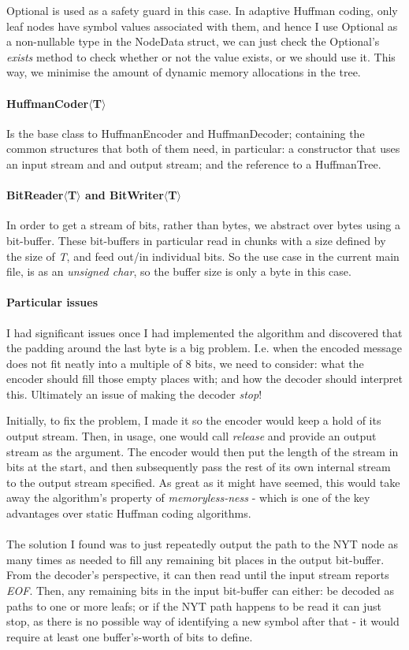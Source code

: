 \documentclass[]{article}
\begin{document}
Optional is used as a safety guard in this case. In adaptive Huffman coding, only leaf nodes have symbol values associated with them, and hence I use Optional as a non-nullable type in the NodeData struct, we can just check the Optional's \emph{exists} method to check whether or not the value exists, or we should use it. This way, we minimise the amount of dynamic memory allocations in the tree.
\paragraph{HuffmanCoder$\langle$T$\rangle$} Is the base class to HuffmanEncoder and HuffmanDecoder; containing the common structures that both of them need, in particular: a constructor that uses an input stream and and output stream; and the reference to a HuffmanTree.
\paragraph{BitReader$\langle$T$\rangle$ and BitWriter$\langle$T$\rangle$} In order to get a stream of bits, rather than bytes, we abstract over bytes using a bit-buffer. These bit-buffers in particular read in chunks with a size defined by the size of \emph{T}, and feed out/in individual bits. So the use case in the current main file, is as an \emph{unsigned char}, so the buffer size is only a byte in this case.
\paragraph{Particular issues} I had significant issues once I had implemented the algorithm and discovered that the padding around the last byte is a big problem. I.e. when the encoded message does not fit neatly into a multiple of 8 bits, we need to consider: what the encoder should fill those empty places with; and how the decoder should interpret this. Ultimately an issue of making the decoder \emph{stop}!

Initially, to fix the problem, I made it so the encoder would keep a hold of its output stream. Then, in usage, one would call \emph{release} and provide an output stream as the argument. The encoder would then put the length of the stream in bits at the start, and then subsequently pass the rest of its own internal stream to the output stream specified. As great as it might have seemed, this would take away the algorithm's property of \emph{memoryless-ness} - which is one of the key advantages over static Huffman coding algorithms.
\\\\
The solution I found was to just repeatedly output the path to the NYT node as many times as needed to fill any remaining bit places in the output bit-buffer. From the decoder's perspective, it can then read until the input stream reports \emph{EOF}. Then, any remaining bits in the input bit-buffer can either: be decoded as paths to one or more leafs; or if the NYT path happens to be read it can just stop, as there is no possible way of identifying a new symbol after that - it would require at least one buffer's-worth of bits to define.
\end{document}
